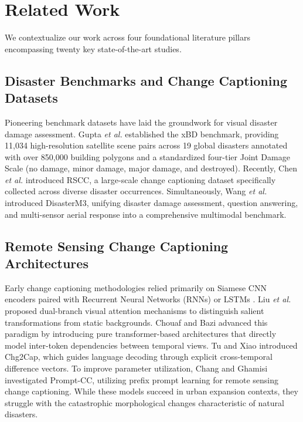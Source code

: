 \documentclass[conference]{IEEEtran}
\begin{document}
\section{Related Work}
We contextualize our work across four foundational literature pillars encompassing twenty key state-of-the-art studies.

\subsection{Disaster Benchmarks and Change Captioning Datasets}
Pioneering benchmark datasets have laid the groundwork for visual disaster damage assessment. Gupta \textit{et al.} \cite{gupta2019xbd} established the xBD benchmark, providing 11,034 high-resolution satellite scene pairs across 19 global disasters annotated with over 850,000 building polygons and a standardized four-tier Joint Damage Scale (no damage, minor damage, major damage, and destroyed). Recently, Chen \textit{et al.} \cite{chen2025rscc} introduced RSCC, a large-scale change captioning dataset specifically collected across diverse disaster occurrences. Simultaneously, Wang \textit{et al.} \cite{wang2025disasterm3} introduced DisasterM3, unifying disaster damage assessment, question answering, and multi-sensor aerial response into a comprehensive multimodal benchmark.

\subsection{Remote Sensing Change Captioning Architectures}
Early change captioning methodologies relied primarily on Siamese CNN encoders paired with Recurrent Neural Networks (RNNs) or LSTMs \cite{hoxha2022change}. Liu \textit{et al.} \cite{liu2022bitemporal} proposed dual-branch visual attention mechanisms to distinguish salient transformations from static backgrounds. Chouaf and Bazi \cite{chouaf2023transformer} advanced this paradigm by introducing pure transformer-based architectures that directly model inter-token dependencies between temporal views. Tu and Xiao \cite{tu2023chg2cap} introduced Chg2Cap, which guides language decoding through explicit cross-temporal difference vectors. To improve parameter utilization, Chang and Ghamisi \cite{chang2023prompt} investigated Prompt-CC, utilizing prefix prompt learning for remote sensing change captioning. While these models succeed in urban expansion contexts, they struggle with the catastrophic morphological changes characteristic of natural disasters.
\end{document}
